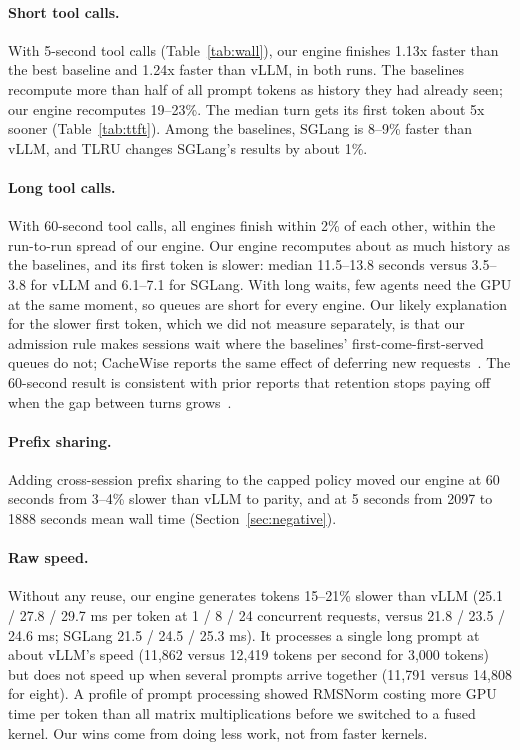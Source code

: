 \documentclass[11pt]{article}
\begin{document}
\paragraph{Short tool calls.} With 5-second tool calls (Table~\ref{tab:wall}), our engine finishes 1.13x faster than the best baseline and 1.24x faster than vLLM, in both runs. The baselines recompute more than half of all prompt tokens as history they had already seen; our engine recomputes 19--23\%. The median turn gets its first token about 5x sooner (Table~\ref{tab:ttft}). Among the baselines, SGLang is 8--9\% faster than vLLM, and TLRU changes SGLang's results by about 1\%.

\paragraph{Long tool calls.} With 60-second tool calls, all engines finish within 2\% of each other, within the run-to-run spread of our engine. Our engine recomputes about as much history as the baselines, and its first token is slower: median 11.5--13.8 seconds versus 3.5--3.8 for vLLM and 6.1--7.1 for SGLang. With long waits, few agents need the GPU at the same moment, so queues are short for every engine. Our likely explanation for the slower first token, which we did not measure separately, is that our admission rule makes sessions wait where the baselines' first-come-first-served queues do not; CacheWise reports the same effect of deferring new requests~\cite{cachewise}. The 60-second result is consistent with prior reports that retention stops paying off when the gap between turns grows~\cite{pensieve,choijoshi,mori}.

\paragraph{Prefix sharing.} Adding cross-session prefix sharing to the capped policy moved our engine at 60 seconds from 3--4\% slower than vLLM to parity, and at 5 seconds from 2097 to 1888 seconds mean wall time (Section~\ref{sec:negative}).

\paragraph{Raw speed.} Without any reuse, our engine generates tokens 15--21\% slower than vLLM (25.1 / 27.8 / 29.7 ms per token at 1 / 8 / 24 concurrent requests, versus 21.8 / 23.5 / 24.6 ms; SGLang 21.5 / 24.5 / 25.3 ms). It processes a single long prompt at about vLLM's speed (11,862 versus 12,419 tokens per second for 3,000 tokens) but does not speed up when several prompts arrive together (11,791 versus 14,808 for eight). A profile of prompt processing showed RMSNorm costing more GPU time per token than all matrix multiplications before we switched to a fused kernel. Our wins come from doing less work, not from faster kernels.
\end{document}
